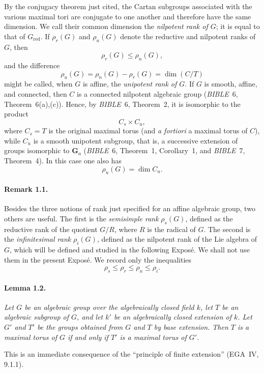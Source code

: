 By the conjugacy theorem just cited, the Cartan subgroups associated
with the various maximal tori are conjugate to one another and
therefore have the same dimension. We call their common dimension the
\emph{nilpotent rank of \(G\)}; it is equal to that of
\(G_{\mathrm{red}}\). If \(\rho_r(G)\) and \(\rho_n(G)\) denote the
reductive and nilpotent ranks of \(G\), then
\[
  \rho_r(G)\leq \rho_n(G),
\]
and the difference
\[
  \rho_u(G)=\rho_n(G)-\rho_r(G)=\dim(C/T)
\]
might be called, when \(G\) is affine, the \emph{unipotent rank of
\(G\)}. If \(G\) is smooth, affine, and connected, then \(C\) is a
connected nilpotent algebraic group (\emph{BIBLE}~6,
Theorem~6(a),(c)). Hence, by \emph{BIBLE}~6, Theorem~2, it is
isomorphic to the product
\[
  C_s\times C_u,
\]
where \(C_s=T\) is the original maximal torus (and \emph{a fortiori}
a maximal torus of \(C\)), while \(C_u\) is a smooth unipotent
subgroup, that is, a successive extension of groups isomorphic to
\(\mathbf G_a\) (\emph{BIBLE}~6, Theorem~1, Corollary~1, and
\emph{BIBLE}~7, Theorem~4). In this case one also has
\[
  \rho_u(G)=\dim C_u.
\]

\paragraph{\textbf{Remark 1.1.}}
Besides the three notions of rank just specified for an affine
algebraic group, two others are useful. The first is the
\emph{semisimple rank} \(\rho_s(G)\), defined as the reductive rank of
the quotient \(G/R\), where \(R\) is the radical of \(G\). The second
is the \emph{infinitesimal rank} \(\rho_i(G)\), defined as the
nilpotent rank of the Lie algebra of \(G\), which will be defined and
studied in the following Exposé. We shall not use them in the present
Exposé. We record only the inequalities
\[
  \rho_s\leq \rho_r\leq \rho_n\leq \rho_i.
\]

\paragraph{\textbf{Lemma 1.2.}}
\emph{Let \(G\) be an algebraic group over the algebraically closed
field \(k\), let \(T\) be an algebraic subgroup of \(G\), and let
\(k'\) be an algebraically closed extension of \(k\). Let \(G'\) and
\(T'\) be the groups obtained from \(G\) and \(T\) by base extension.
Then \(T\) is a maximal torus of \(G\) if and only if \(T'\) is a
maximal torus of \(G'\).}

This is an immediate consequence of the ``principle of finite
extension'' (EGA~IV, 9.1.1).

